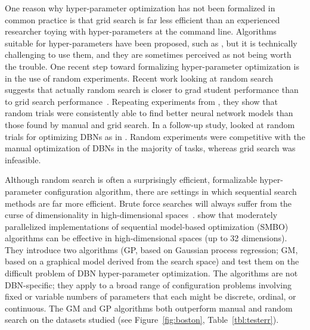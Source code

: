 \documentclass{article}
\renewcommand{\citet}{\cite}
\begin{document}
One reason why hyper-parameter optimization has not been formalized in common
practice is that grid search is far less efficient than an experienced researcher
toying with hyper-parameters at the command line.
Algorithms suitable for hyper-parameters have been proposed, such as
\cite{kirkpatrick+gelatt+vecchi:1983,hanson+muller+koumoutsakos:2003,kleinman+spall+naiman:1999,drew+homem-de-mello:2006,hutter+hoos+leyton+brown:2011,bubeck+munos+stoltz+szepesvari:2009,srinivasan+ramakrishnan:2011},
but it is technically challenging to use them, and they are sometimes perceived as not being worth the trouble.
One recent step toward formalizing hyper-parameter optimization is in the use of random experiments.
Recent work looking at random search suggests that actually random search is closer
to grad student performance than to grid search performance~\citet{Bergstra+Bengio:2011snowbird}.
Repeating experiments from \citet{Larochelle+etal:2007}, they show that
random trials were consistently able to find better neural network models than those found by
manual and grid search.
In a follow-up study, \citet{bergstra+bengio:2011jmlrANON} looked at random trials
for optimizing DBNs as in \citet{Larochelle+etal:2007}.
Random experiments were competitive with the manual optimization of DBNs in the majority of tasks,
whereas grid search was infeasible.

Although random search is often a surprisingly efficient, formalizable hyper-parameter configuration algorithm,
there are settings in which sequential search methods are far more efficient.
Brute force searches will always suffer from the curse of dimensionality in high-dimensional spaces~\citep{bellman:1961}.
\citet{bergstra+bardenet+bengio+kegl:2011} show that moderately parallelized implementations
of sequential model-based optimization (SMBO) algorithms can be effective in high-dimensional spaces
(up to 32 dimensions).
They introduce two algorithms (GP, based on Gaussian process regression; GM, based on a graphical model derived from the search space)
and test them on the difficult problem of DBN hyper-parameter optimization.
The algorithms are not DBN-specific; they apply to a broad range of configuration problems involving
fixed or variable numbers of parameters that each might be discrete, ordinal, or continuous.
The GM and GP algorithms both outperform manual and random search on the datasets studied (see Figure~\ref{fig:boston},
Table~\ref{tbl:testerr}).
\end{document}
